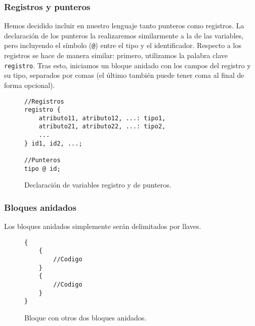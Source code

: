 \subsubsection{Registros y punteros}
Hemos decidido incluir en nuestro lenguaje tanto punteros como registros. La
declaración de los punteros la realizaremos similarmente a la de las variables,
pero incluyendo el símbolo (\lstinline{@}) entre el tipo y el identificador. Respecto a los
registros se hace de manera similar: primero, utilizamos la palabra clave \lstinline{registro}. Tras esto, iniciamos un bloque anidado
con los campos del registro y su tipo, separados por comas (el último también
puede tener coma al final de forma opcional).
\begin{figure}[htbp]
    \centering
    \begin{lstlisting}
//Registros
registro {
    atributo11, atributo12, ...: tipo1,
    atributo21, atributo22, ...: tipo2,
    ...
} id1, id2, ...;

//Punteros
tipo @ id;
    \end{lstlisting}
    \caption{Declaración de variables registro y de punteros.}
\end{figure}

\subsubsection{Bloques anidados}
Los bloques anidados simplemente serán delimitados por llaves.
\begin{figure}[htbp]
    \centering
    \begin{lstlisting}
{
    {
        //Codigo
    }
    {
        //Codigo
    }
}
    \end{lstlisting}
    \caption{Bloque con otros dos bloques anidados.}
\end{figure}

